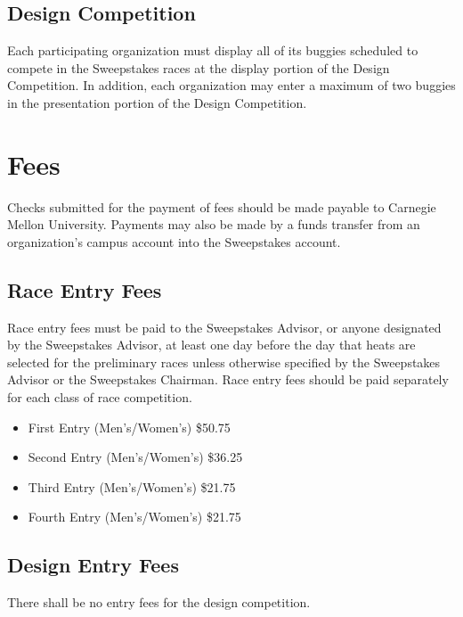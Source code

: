 \subsection{Design Competition}

	Each participating organization must display all of its buggies scheduled to compete in the Sweepstakes races at the display portion of the Design Competition. In addition, each organization may enter a maximum of two buggies in the presentation portion of the Design Competition.

\section{Fees}

	Checks submitted for the payment of fees should be made payable to Carnegie Mellon University. Payments may also be made by a funds transfer from an organization's campus account into the Sweepstakes account. 

\subsection{Race Entry Fees}

	Race entry fees must be paid to the Sweepstakes Advisor, or anyone designated by the Sweepstakes Advisor, at least one day before the day that heats are selected for the preliminary races unless otherwise specified by the Sweepstakes Advisor or the Sweepstakes Chairman. Race entry fees should be paid separately for each class of race competition.

	\begin{itemize}
		\item First Entry (Men's/Women's) \$50.75
		\item Second Entry (Men's/Women's) \$36.25
		\item Third Entry (Men's/Women's) \$21.75
		\item Fourth Entry (Men's/Women's) \$21.75
	\end{itemize}

\subsection{Design Entry Fees}

	There shall be no entry fees for the design competition.


